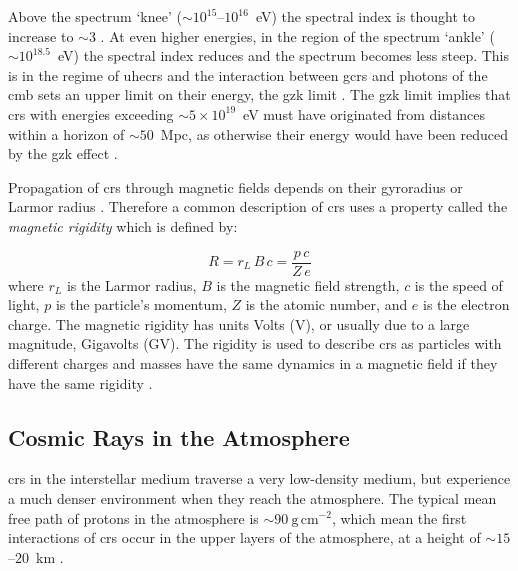 Above the spectrum `knee' ($\sim10^{15}$--$10^{16}$~eV) the spectral index is thought to increase to $\sim3$ \citep{particle_data_group_review_2020}. At even higher energies, in the region of the spectrum `ankle' ($\sim10^{18.5}$~eV) the spectral index reduces and the spectrum becomes less steep. This is in the regime of \glspl{uhecr} and the interaction between \glspl{gcr} and photons of the \gls{cmb} sets an upper limit on their energy, the \gls{gzk} limit \citep{particle_data_group_review_2020}. The \gls{gzk} limit implies that \glspl{cr} with energies exceeding $\sim5\times10^{19}$~eV must have originated from distances within a horizon of $\sim50$~Mpc, as otherwise their energy would have been reduced by the \gls{gzk} effect \citep{particle_data_group_review_2020}. 


Propagation of \glspl{cr} through magnetic fields depends on their gyroradius or Larmor radius \citep{particle_data_group_review_2020}. Therefore a common description of \glspl{cr} uses a property called the {\textit{magnetic rigidity}} which is defined by:

\begin{equation}
\label{eq:rigidity}
R = r_L \, B \, c = \frac{p \, c}{Z \, e}
\end{equation}
%
where $r_L$ is the Larmor radius, $B$ is the magnetic field strength, $c$ is the speed of light, $p$ is the particle's momentum, $Z$ is the atomic number, and $e$ is the electron charge. The magnetic rigidity has units Volts (V), or usually due to a large magnitude, Gigavolts (GV). The rigidity is used to describe \glspl{cr} as particles with different charges and masses have the same dynamics in a magnetic field if they have the same rigidity \citep{particle_data_group_review_2020}.



\subsection{Cosmic Rays in the Atmosphere}
\label{sec:air_shower}

\glspl{cr} in the interstellar medium traverse a very low-density medium, but experience a much denser environment when they reach the atmosphere. The typical mean free path of protons in the atmosphere is $\sim90~\mathrm{g}\,\mathrm{cm}^{-2}$, which mean the first interactions of \glspl{cr} occur in the upper layers of the atmosphere, at a height of $\sim15$--$20$~km \citep{grupen_astroparticle_2005}. %

